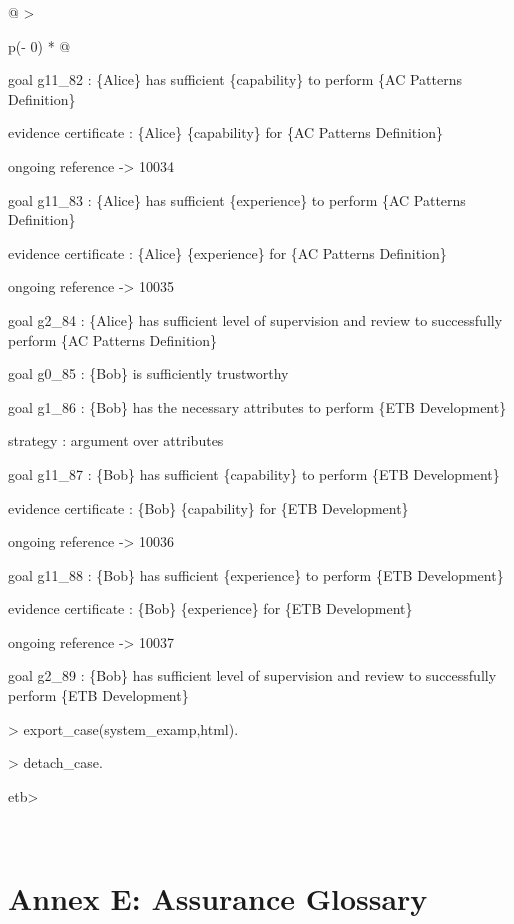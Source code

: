 \documentclass[12pt,twoside,a4paper]{article}
\begin{document}
\begin{longtable}[]{@{}
  >{\raggedright\arraybackslash}p{(\columnwidth - 0\tabcolsep) * }@{}}
\begin{minipage}[b]{\linewidth}
goal g11\_82 : \{Alice\} has sufficient \{capability\} to perform \{AC Patterns Definition\}

evidence certificate : \{Alice\} \{capability\} for \{AC Patterns Definition\}

ongoing reference -\textgreater{} 10034

goal g11\_83 : \{Alice\} has sufficient \{experience\} to perform \{AC Patterns Definition\}

evidence certificate : \{Alice\} \{experience\} for \{AC Patterns Definition\}

ongoing reference -\textgreater{} 10035

goal g2\_84 : \{Alice\} has sufficient level of supervision and review to successfully perform \{AC Patterns Definition\}

goal g0\_85 : \{Bob\} is sufficiently trustworthy

goal g1\_86 : \{Bob\} has the necessary attributes to perform \{ETB Development\}

strategy : argument over attributes

goal g11\_87 : \{Bob\} has sufficient \{capability\} to perform \{ETB Development\}

evidence certificate : \{Bob\} \{capability\} for \{ETB Development\}

ongoing reference -\textgreater{} 10036

goal g11\_88 : \{Bob\} has sufficient \{experience\} to perform \{ETB Development\}

evidence certificate : \{Bob\} \{experience\} for \{ETB Development\}

ongoing reference -\textgreater{} 10037

goal g2\_89 : \{Bob\} has sufficient level of supervision and review to successfully perform \{ETB Development\}

\textgreater{} export\_case(system\_examp,html).

\textgreater{} detach\_case.

etb\textgreater{}
\end{minipage} \\
\midrule
\endhead
\bottomrule
\end{longtable}

\clearpage
\hypertarget{annex-e-assurance-glossary}{%
\section{Annex E: Assurance Glossary}\label{annex-e-assurance-glossary}}
\end{document}
